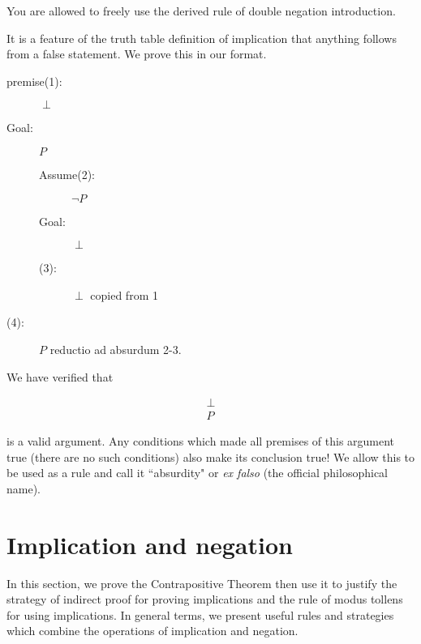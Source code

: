 \documentclass[12pt]{article}
\begin{document}
You are allowed to freely use the derived rule of double negation introduction.

It is a feature of the truth table definition of implication that anything follows from a false statement.  We prove this in our format.

\begin{description}

\item[premise(1):]  $\perp$

\item[Goal:]  $P$

\begin{description}

\item[Assume(2):]  $\neg P$

\item[Goal:]  $\perp$

\item[(3):]  $\perp$  copied from 1

\end{description}

\item[(4):]  $P$ reductio ad absurdum 2-3.


\end{description}

We have verified that

$$\begin{array}{c}

\perp \\ \hline

P

\end{array}$$

is a valid argument.  Any conditions which made all premises of this argument true (there are no such conditions) also make its conclusion true!  We allow this to be used
as a rule and call it ``absurdity" or {\em ex falso} (the official philosophical name).


\newpage

\section{Implication and negation}

In this section, we prove the Contrapositive Theorem then use it to justify the strategy of indirect proof for proving implications and the rule of modus tollens for using implications.  In general terms, we present useful rules and strategies which combine the operations of implication and negation.
\end{document}
